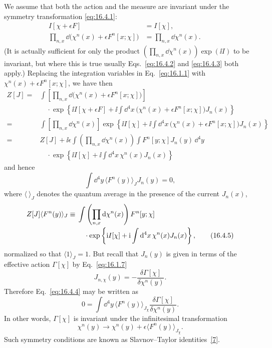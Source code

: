 We assume that both the action and the measure are invariant under the symmetry transformation \eqref{eq:16.4.1}:
\begin{align}
I[\chi+\epsilon F]&=I[\chi],
&&\tag{16.4.2}\label{eq:16.4.2}\\
\prod_{n,x}\dd\bigl(\chi^n(x)+\epsilon F^n[x;\chi]\bigr)
&=\prod_{n,x}\dd\chi^n(x).
&&\tag{16.4.3}\label{eq:16.4.3}
\end{align}
(It is actually sufficient for only the product $(\prod_{n,x}\dd\chi^n(x))\exp(\ii I)$ to be invariant, but where this is true usually Eqs.~\eqref{eq:16.4.2} and \eqref{eq:16.4.3} both apply.) Replacing the integration variables in Eq.~\eqref{eq:16.1.1} with $\chi^n(x)+\epsilon F^n[x;\chi]$, we have then
\begin{align*}
Z[J]={}&\int\left[\prod_{n,x}\dd\bigl(\chi^n(x)+\epsilon F^n[x;\chi]\bigr)\right]
\\[-2pt]
&\quad\cdot\exp\left\{\ii I[\chi+\epsilon F]
+\ii\int \dd^4x\,\bigl(\chi^n(x)+\epsilon F^n[x;\chi]\bigr)J_n(x)\right\}
\\
={}&\int\left[\prod_{n,x}\dd\chi^n(x)\right]
\exp\left\{\ii I[\chi]
+\ii\int \dd^4x\,\bigl(\chi^n(x)+\epsilon F^n[x;\chi]\bigr)J_n(x)\right\}
\\
={}&Z[J]+\ii\epsilon\int\left(\prod_{n,x}\dd\chi^n(x)\right)
\int F^n[y;\chi]J_n(y)\,\dd^4y
\\[-2pt]
&\quad\cdot\exp\left\{\ii I[\chi]+\ii\int \dd^4x\,\chi^n(x)J_n(x)\right\}
\end{align*}
and hence
\begin{equation}
\int \dd^4y\,\langle F^n(y)\rangle_J J_n(y)=0,
\tag{16.4.4}\label{eq:16.4.4}
\end{equation}
where $\langle\ \rangle_J$ denotes the quantum average in the presence of the current $J_n(x)$,
\begin{align}
Z[J]\langle F^n(y)\rangle_J\equiv{}&
\int\left(\prod_{n,x}\mathop{}\!\mathrm{d}\chi^n(x)\right)F^n[y;\chi]
\notag\\[-2pt]
&\quad\cdot\exp\left\{\mathrm{i} I[\chi]+\mathrm{i}\int \mathop{}\!\mathrm{d}^4x\,\chi^n(x)J_n(x)\right\},
\tag{16.4.5}\label{eq:16.4.5}
\end{align}
normalized so that $\langle1\rangle_J=1$. But recall that $J_n(y)$ is given in terms of the effective action $\Gamma[\chi]$ by Eq.~\eqref{eq:16.1.7}
\[
J_{n,\chi}(y)=-\frac{\delta\Gamma[\chi]}{\delta\chi^n(y)}.
\]
Therefore Eq.~\eqref{eq:16.4.4} may be written as
\begin{equation}
0=\int \dd^4y\,\langle F^n(y)\rangle_{J_\chi}
\frac{\delta\Gamma[\chi]}{\delta\chi^n(y)}.
\tag{16.4.6}\label{eq:16.4.6}
\end{equation}
In other words, $\Gamma[\chi]$ is invariant under the infinitesimal transformation
\begin{equation}
\chi^n(y)\longrightarrow\chi^n(y)+\epsilon\langle F^n(y)\rangle_{J_\chi}.
\tag{16.4.7}\label{eq:16.4.7}
\end{equation}
Such symmetry conditions are known as Slavnov--Taylor identities~\hyperref[ch16-ref-7]{[7]}.

